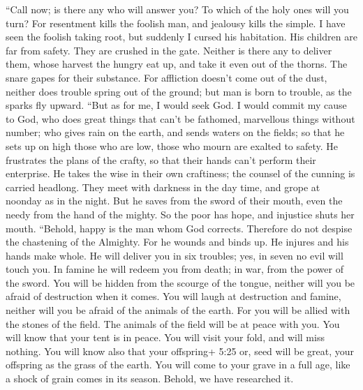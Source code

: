  ``Call now; is there any who will answer you? To which of
the holy ones will you turn?  For resentment kills the
foolish man, and jealousy kills the simple.  I have seen the
foolish taking root, but suddenly I cursed his habitation. 
His children are far from safety. They are crushed in the gate. Neither
is there any to deliver them,  whose harvest the hungry eat
up, and take it even out of the thorns. The snare gapes for their
substance.  For affliction doesn't come out of the dust,
neither does trouble spring out of the ground;  but man is
born to trouble, as the sparks fly upward.  ``But as for me,
I would seek God. I would commit my cause to God,  who does
great things that can't be fathomed, marvellous things without number;
 who gives rain on the earth, and sends waters on the
fields;  so that he sets up on high those who are low,
those who mourn are exalted to safety.  He frustrates the
plans of the crafty, so that their hands can't perform their enterprise.
 He takes the wise in their own craftiness; the counsel of
the cunning is carried headlong.  They meet with darkness
in the day time, and grope at noonday as in the night.  But
he saves from the sword of their mouth, even the needy from the hand of
the mighty.  So the poor has hope, and injustice shuts her
mouth.  ``Behold, happy is the man whom God corrects.
Therefore do not despise the chastening of the Almighty. 
For he wounds and binds up. He injures and his hands make whole.
 He will deliver you in six troubles; yes, in seven no evil
will touch you.  In famine he will redeem you from death;
in war, from the power of the sword.  You will be hidden
from the scourge of the tongue, neither will you be afraid of
destruction when it comes.  You will laugh at destruction
and famine, neither will you be afraid of the animals of the earth.
 For you will be allied with the stones of the field. The
animals of the field will be at peace with you.  You will
know that your tent is in peace. You will visit your fold, and will miss
nothing.  You will know also that your offspring+ 5:25 or,
seed will be great, your offspring as the grass of the earth.
 You will come to your grave in a full age, like a shock of
grain comes in its season.  Behold, we have researched it.
